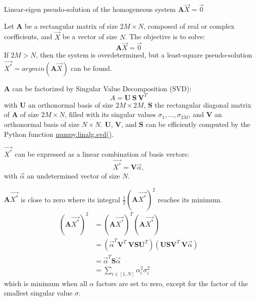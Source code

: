 \begin{algorithm}[!ht]
  \caption{Linear-eigen pseudo-solution of the homogeneous system \(\textbf{A} \overrightarrow{X} = \overrightarrow{0}\)}\label{alg:svd}
  \begin{algorithmic}[1]
      \STATEx Let $\textbf{A}$ be a rectangular matrix of size $2M \times N$, composed of real or complex coefficients, and $\overrightarrow{X}$ be a vector of size $N$. The objective is to solve: 
      \begin{equation}
        \textbf{A} \overrightarrow{X} = \overrightarrow{0}
      \end{equation}
      \STATEx If $2M>N$, then the system is overdetermined, but a least-square pseudo-solution $\overrightarrow{X^*} = argmin(\textbf{A} \overrightarrow{X})$ can be found.
      
      \STATE \textbf{A} can be factorized by Singular Value Decomposition (SVD):
      \begin{equation}
        A = \textbf{U} \ \textbf{S} \ \textbf{V}^T
      \end{equation}
      with $\textbf{U}$ an orthonormal basis of size $2M \times 2M$, \(\textbf{S}\) the rectangular diagonal matrix of \textbf{A} of size $2M \times N$, filled with its singular values \(\sigma_1, \dots, \sigma_{2M}\), and $\textbf{V}$ an orthonormal basis of size $N \times N$. $\textbf{U}$, $\textbf{V}$, and $\textbf{S}$ can be efficiently computed by the Python function \href{https://numpy.org/doc/stable/reference/generated/numpy.linalg.svd.html}{numpy.linalg.svd()}.
      
      \STATE \(\overrightarrow{X^*}\) can be expressed as a linear combination of basis vectors: 
      \begin{equation}\label{eq:xva}
        \overrightarrow{X^*} = \textbf{V} \overrightarrow{\alpha},
      \end{equation}
      with \(\overrightarrow{\alpha}\) an undetermined vector of size $N$.  
      
      \STATE \(\textbf{A}\overrightarrow{X^*}\) is close to zero where its integral \(\frac{1}{2}(\textbf{A}\overrightarrow{X^*})^2\) reaches its minimum.
      \begin{equation}
          \begin{aligned}
          (\textbf{A}\overrightarrow{X^*})^2 & = (\textbf{A} \overrightarrow{X^*})^T (\textbf{A} \overrightarrow{X^*})\\
          & = (\overrightarrow{\alpha}^T \textbf{V}^T \ \textbf{V} \textbf{S} \textbf{U}^T)(\textbf{U} \textbf{S} \textbf{V}^T \ \textbf{V}\overrightarrow{\alpha})\\
          & = \overrightarrow{\alpha}^T \textbf{S} \overrightarrow{\alpha}\\
          & = \sum_{i \in [1,N]} \alpha_i^2 \sigma_i^2
          \end{aligned}
      \end{equation}
      which is minimum when all \(\alpha\) factors are set to zero, except for the factor of the smallest singular value \(\sigma\). 


\end{algorithmic}
\end{algorithm}
